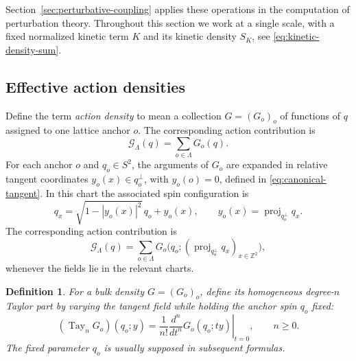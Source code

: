 \documentclass[11pt]{article}
\newcommand{\R}{\mathbb R}
\newcommand{\proj}{\operatorname{proj}}
\newcommand{\Tay}{\operatorname{Tay}}
\numberwithin{equation}{section}
\newtheorem{definition}[theorem]{Definition}
\theoremstyle{definition}
\theoremstyle{plain}
\begin{document}
Section~\ref{sec:perturbative-coupling} applies these operations
in the computation of perturbation theory.  Throughout this section we work at
a single scale, with a fixed normalized kinetic term $K$ and its kinetic density $S_K$,
see \eqref{eq:kinetic-density-sum}.

\subsection{Effective action densities}
\label{subsec:action-densities}

Define the term \emph{action density} to mean a collection $G=(G_o)_o$ 
of functions of $q$ assigned to one lattice anchor $o$.
The corresponding action contribution is
\begin{equation}
 \mathcal G_\Lambda(q)
   =\sum_{o\in\Lambda}   G_o(q).
\end{equation}
%
For each anchor $o$ and $q_o\in S^2$,
the arguments of $G_o$ are expanded in relative tangent coordinates
$y_o(x)\in q_o^\perp$, with $y_o(o)=0$, defined in
\eqref{eq:canonical-tangent}.
%
In this chart the associated spin configuration is
\begin{equation}
 q_x=\sqrt{1-|y_o(x)|^2}\,q_o+y_o(x),
 \qquad
 y_o(x)=\proj_{q_o^\perp}q_x.
 \label{eq:loc-density-spin-chart}
\end{equation}
The corresponding action contribution is
\begin{equation}
 \mathcal G_\Lambda(q)
   =\sum_{o\in\Lambda}
       G_o\bigl(q_o;(\proj_{q_o^\perp}q_x)_{x\in\mathbb Z^2}\bigr),
 \label{eq:loc-density-sum}
\end{equation}
whenever the fields lie in the relevant charts.


\begin{definition}
For a bulk density $G=(G_o)_o$, define its homogeneous degree-$n$
Taylor part by varying the tangent field while holding the
anchor spin $q_o$ fixed:
\begin{equation}
 (\Tay_n G_o)(q_o;y)
   =\frac1{n!}\left.\frac{d^n}{dt^n}G_o(q_o;ty)\right|_{t=0},
 \qquad n\geq0.
 \label{eq:kinetic-loc-taylor}
\end{equation}
The fixed parameter $q_o$ is usually supposed in subsequent formulas.
\end{definition}
\end{document}
